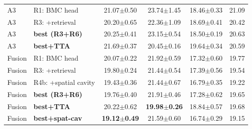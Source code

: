 \begin{table}[t]
{\begin{tabular}{l l c c c c}
\midrule
A3 & R1: BMC head & 21.07$\pm$0.50 & 23.74$\pm$1.45 & 18.46$\pm$0.33 & 21.09 \\
A3 & R3: +retrieval & 20.20$\pm$0.65 & 22.36$\pm$1.09 & 18.69$\pm$0.41 & 20.42 \\
A3 & \textbf{best (R3+R6)} & 20.25$\pm$0.41 & 23.15$\pm$0.54 & 18.50$\pm$0.19 & 20.63 \\
A3 & \textbf{best+TTA} & 21.69$\pm$0.37 & 20.45$\pm$0.16 & 19.64$\pm$0.34 & 20.59 \\
\midrule
Fusion & R1: BMC head & 20.07$\pm$0.22 & 21.92$\pm$0.59 & 17.32$\pm$0.60 & 19.77 \\
Fusion & R3: +retrieval & 19.80$\pm$0.24 & 21.44$\pm$0.54 & 17.39$\pm$0.56 & 19.54 \\
Fusion & R4b: +spatial cavity & 19.43$\pm$0.36 & 21.44$\pm$0.67 & 16.79$\pm$0.35 & 19.22 \\
Fusion & \textbf{best (R3+R6)} & 19.76$\pm$0.40 & 21.91$\pm$0.46 & 17.28$\pm$0.62 & 19.65 \\
Fusion & \textbf{best+TTA} & 20.22$\pm$0.62 & \textbf{19.98$\pm$0.26} & 18.84$\pm$0.57 & 19.68 \\
Fusion & \textbf{best+spat-cav} & \textbf{19.12$\pm$0.49} & 21.59$\pm$0.60 & 16.74$\pm$0.29 & 19.15 \\
\bottomrule
\end{tabular}%
}
\end{table}